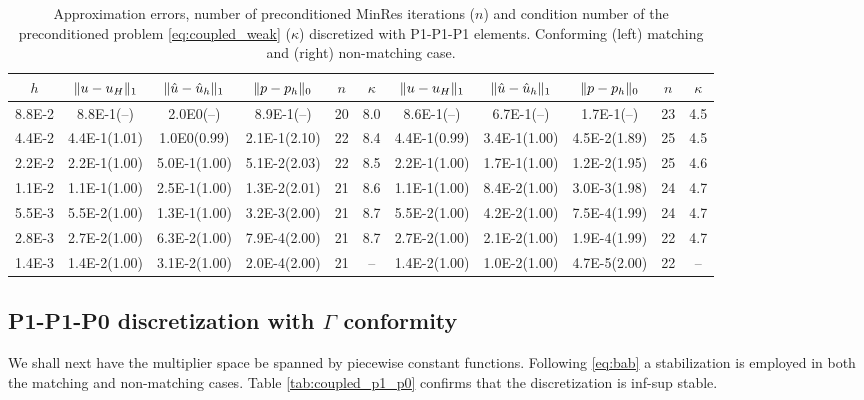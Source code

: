 \documentclass[r]{siamart171218}
\begin{document}
\begin{table}
  \begin{center}
    \scriptsize{
  \begin{tabular}{c|ccc|c|c||ccc|c|c}
    \hline
    $h$ & $\lVert{u-u_H}\rVert_1$ & $\lVert{\hat{u}-\hat{u}_h}\rVert_1$ & $\lVert{p-p_h}\rVert_0$ & $n$ & $\kappa$
        & $\lVert{u-u_H}\rVert_1$ & $\lVert{\hat{u}-\hat{u}_h}\rVert_1$ & $\lVert{p-p_h}\rVert_0$ & $n$ & $\kappa$ \\
    \hline
8.8E-2 & 8.8E-1(--)   & 2.0E0(--)    & 8.9E-1(--)   & 20 & 8.0 & 8.6E-1(--)   & 6.7E-1(--)   & 1.7E-1(--)   & 23 & 4.5  \\
4.4E-2 & 4.4E-1(1.01) & 1.0E0(0.99)  & 2.1E-1(2.10) & 22 & 8.4 & 4.4E-1(0.99) & 3.4E-1(1.00) & 4.5E-2(1.89) & 25 & 4.5  \\
2.2E-2 & 2.2E-1(1.00) & 5.0E-1(1.00) & 5.1E-2(2.03) & 22 & 8.5 & 2.2E-1(1.00) & 1.7E-1(1.00) & 1.2E-2(1.95) & 25 & 4.6  \\
1.1E-2 & 1.1E-1(1.00) & 2.5E-1(1.00) & 1.3E-2(2.01) & 21 & 8.6 & 1.1E-1(1.00) & 8.4E-2(1.00) & 3.0E-3(1.98) & 24 & 4.7  \\
5.5E-3 & 5.5E-2(1.00) & 1.3E-1(1.00) & 3.2E-3(2.00) & 21 & 8.7 & 5.5E-2(1.00) & 4.2E-2(1.00) & 7.5E-4(1.99) & 24 & 4.7  \\
2.8E-3 & 2.7E-2(1.00) & 6.3E-2(1.00) & 7.9E-4(2.00) & 21 & 8.7 & 2.7E-2(1.00) & 2.1E-2(1.00) & 1.9E-4(1.99) & 22 & 4.7  \\
1.4E-3 & 1.4E-2(1.00) & 3.1E-2(1.00) & 2.0E-4(2.00) & 21 & --  & 1.4E-2(1.00) & 1.0E-2(1.00) & 4.7E-5(2.00) & 22 & --   \\
    \hline
  \end{tabular}
    }
    \caption{Approximation errors, number of preconditioned MinRes iterations ($n$) and
      condition number of the preconditioned problem \eqref{eq:coupled_weak} ($\kappa$) discretized
      with P1-P1-P1 elements. Conforming (left) matching and (right) non-matching case.}
  \label{tab:coupled_p1_p1}
  \end{center}
\end{table}


\subsection{P1-P1-P0 discretization with $\Gamma$ conformity} 
We shall next have the multiplier space be spanned by piecewise constant
functions. Following \eqref{eq:bab} a stabilization \cite{burman2014projection}
is employed in both the matching and non-matching cases. Table \ref{tab:coupled_p1_p0}
confirms that the discretization is inf-sup stable. 
\end{document}
